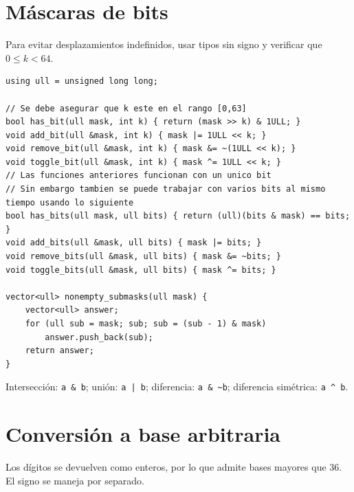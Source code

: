\section{M\'ascaras de bits}

Para evitar desplazamientos indefinidos, usar tipos sin signo y verificar que
$0\le k<64$.

\begin{lstlisting}[style=cpp]
using ull = unsigned long long;

// Se debe asegurar que k este en el rango [0,63]
bool has_bit(ull mask, int k) { return (mask >> k) & 1ULL; }
void add_bit(ull &mask, int k) { mask |= 1ULL << k; }
void remove_bit(ull &mask, int k) { mask &= ~(1ULL << k); }
void toggle_bit(ull &mask, int k) { mask ^= 1ULL << k; }
// Las funciones anteriores funcionan con un unico bit
// Sin embargo tambien se puede trabajar con varios bits al mismo tiempo usando lo siguiente
bool has_bits(ull mask, ull bits) { return (ull)(bits & mask) == bits; }
void add_bits(ull &mask, ull bits) { mask |= bits; }
void remove_bits(ull &mask, ull bits) { mask &= ~bits; }
void toggle_bits(ull &mask, ull bits) { mask ^= bits; }

vector<ull> nonempty_submasks(ull mask) {
    vector<ull> answer;
    for (ull sub = mask; sub; sub = (sub - 1) & mask)
        answer.push_back(sub);
    return answer;
}
\end{lstlisting}

Intersecci\'on: \verb+a & b+; uni\'on: \verb+a | b+; diferencia:
\verb+a & ~b+; diferencia sim\'etrica: \verb+a ^ b+.

\section{Conversi\'on a base arbitraria}

Los d\'igitos se devuelven como enteros, por lo que admite bases mayores que
36. El signo se maneja por separado.

